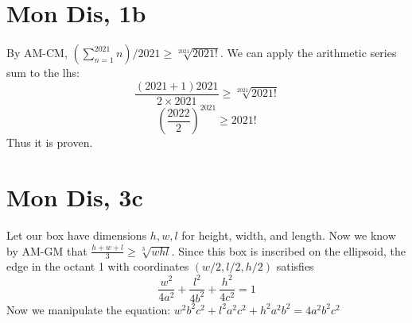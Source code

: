 \documentclass[12pt]{article}
\begin{document}
\section{Mon Dis, 1b}
By AM-CM, $(\sum_{n=1}^{2021} n) /2021 \geq \sqrt[2021]{2021!}$. We can apply the arithmetic series sum to the lhs:
$$\frac{(2021+1)2021}{2 \times 2021} \geq \sqrt[2021]{2021!}$$
$$(\frac{2022}{2}) ^ {2021} \geq 2021!$$
Thus it is proven.


\section{Mon Dis, 3c}
Let our box have dimensions $h,w,l$ for height, width, and length. Now we know by AM-GM that $\frac{h+w+l}{3} \geq \sqrt[3]{whl}$. Since this box is inscribed on the ellipsoid, the edge in the octant 1 with coordinates $(w/2,l/2,h/2)$ satisfies $$\frac{w^2}{4a^2}+\frac{l^2}{4b^2}+\frac{h^2}{4c^2} = 1$$
Now we manipulate the equation: $w^2b^2c^2+l^2a^2c^2+h^2a^2b^2 = 4a^2b^2c^2$
\end{document}
